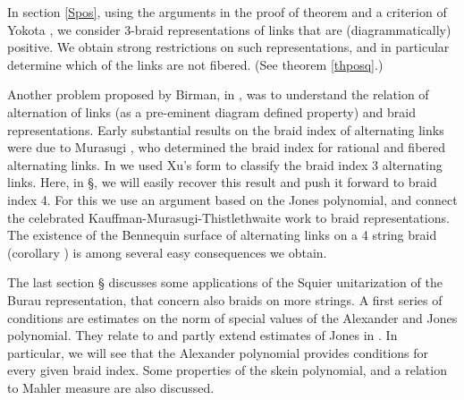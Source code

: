 In section \ref{Spos},
using the arguments in the proof of theorem 
and a criterion of Yokota \cite{Yokota}, we consider 3-braid
representations of links that are (diagrammatically) positive.
We obtain strong restrictions on such representations,
and in particular determine which of the links are not fibered.
(See theorem \ref{thposq}.)


Another problem proposed by Birman, in \cite{MortonPb},
was to understand the relation of alternation of links
(as a pre-eminent diagram defined property) and braid
representations. Early substantial results on the braid
index of alternating links were due to Murasugi \cite{Murasugi},
who determined the braid index for rational and fibered
alternating links. In \cite{3br} we used Xu's form to classify
the braid index 3 alternating links. Here, in \S{},
we will easily recover this result and push it forward to braid
index 4. For this we use an argument based on the Jones polynomial,
and connect the celebrated Kauffman-Murasugi-Thistlethwaite work
\cite{Kauffman2,Murasugi3,Thistle2} to braid representations.
The existence of the Bennequin surface of alternating links on a
4 string braid (corollary ) is among several easy
consequences we obtain.

The last section \S{} discusses some applications
of the Squier unitarization \cite{Squier} of the Burau
representation, that concern also braids on more strings. A
first series of conditions are estimates on the norm of special
values of the Alexander and Jones polynomial. They relate to and
partly extend estimates of Jones in \cite{Jones}. In particular, we
will see that the Alexander polynomial provides conditions for every
given braid index. Some properties of the skein polynomial, and a
relation to Mahler measure are also discussed.


